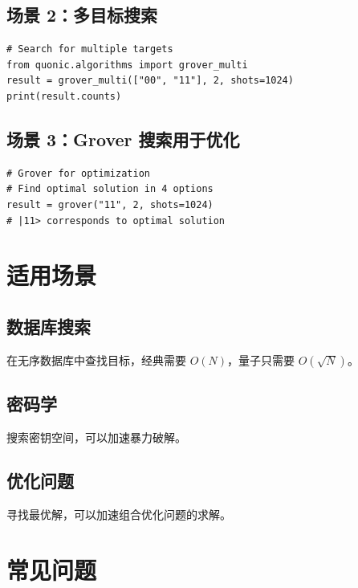 \documentclass[12pt,a4paper]{article}
\begin{document}
\subsection{场景 2：多目标搜索}

\begin{lstlisting}[style=python]
# Search for multiple targets
from quonic.algorithms import grover_multi
result = grover_multi(["00", "11"], 2, shots=1024)
print(result.counts)
\end{lstlisting}

\subsection{场景 3：Grover 搜索用于优化}

\begin{lstlisting}[style=python]
# Grover for optimization
# Find optimal solution in 4 options
result = grover("11", 2, shots=1024)
# |11> corresponds to optimal solution
\end{lstlisting}

\section{适用场景}

\subsection{数据库搜索}

在无序数据库中查找目标，经典需要 $O(N)$，量子只需要 $O(\sqrt{N})$。

\subsection{密码学}

搜索密钥空间，可以加速暴力破解。

\subsection{优化问题}

寻找最优解，可以加速组合优化问题的求解。

\section{常见问题}
\end{document}
